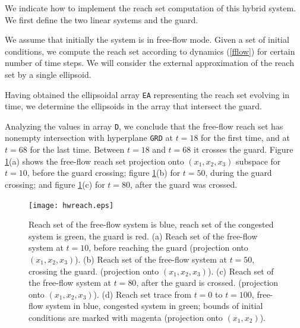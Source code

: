 \documentclass{report}
\begin{document}
We indicate how to implement the reach set computation of this hybrid system.
We first define the two linear systems and the guard.

We assume that initially the system is in free-flow mode.
Given a set of initial conditions, we  compute the reach set according
to dynamics (\ref{fflow}) for certain number of time steps.
We will consider the external approximation of the reach set by a single
ellipsoid.

Having obtained the ellipsoidal array {\tt EA} representing the reach set
evolving in time, we  determine the  ellipsoids in the array that
intersect the guard.

Analyzing the values in array {\tt D}, we conclude that the free-flow reach set
has nonempty intersection with hyperplane {\tt GRD} at $t=18$
for the first time, and at $t=68$ for the last time.
Between $t=18$ and
$t=68$ it crosses the guard. Figure \ref{hwreachfig}(a) shows the
free-flow reach set projection onto $(x_1,x_2,x_3)$ subspace for $t=10$,
before the guard crossing; figure \ref{hwreachfig}(b) for $t=50$,
during the guard crossing; and figure \ref{hwreachfig}(c) for $t=80$,
after the guard was crossed.
\begin{figure}[htbp]
\centerline{
\texttt{[image: hwreach.eps]}}
\caption{Reach set of the free-flow system is blue, reach set of the congested
system is green, the guard is red.
\newline
(a) Reach set of the free-flow system at $t = 10$, before reaching the guard
(projection onto $(x_1,x_2,x_3)$).
\newline
(b) Reach set of the free-flow system at $t = 50$, crossing the guard.
(projection onto $(x_1,x_2,x_3)$).
\newline
(c) Reach set of the free-flow system at $t = 80$, after the guard is crossed.
(projection onto $(x_1,x_2,x_3)$).
\newline
(d) Reach set trace from $t=0$ to $t=100$, free-flow system in blue,
congested system in green; bounds of initial conditions are marked with magenta
(projection onto $(x_1,x_2)$).  }
\label{hwreachfig}
\end{figure}
\end{document}
